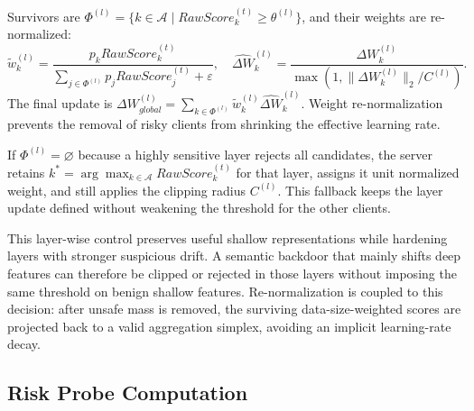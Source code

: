 \documentclass[runningheads,orivec]{llncs}
\begin{document}
Survivors are $\Phi^{(l)}=\{k\in\mathcal{A}\mid RawScore_k^{(t)}\ge\theta^{(l)}\}$, and their weights are re-normalized:
\begin{equation}
    \tilde{w}_{k}^{(l)}=\frac{p_kRawScore_k^{(t)}}{\sum_{j\in\Phi^{(l)}}p_jRawScore_j^{(t)}+\varepsilon},\quad
    \widehat{\Delta W}_k^{(l)}=\frac{\Delta W_k^{(l)}}{\max(1,\|\Delta W_k^{(l)}\|_2/C^{(l)})}.
\end{equation}
The final update is $\Delta W_{global}^{(l)}=\sum_{k\in\Phi^{(l)}}\tilde{w}_{k}^{(l)}\widehat{\Delta W}_k^{(l)}$. Weight re-normalization prevents the removal of risky clients from shrinking the effective learning rate.

If $\Phi^{(l)}=\varnothing$ because a highly sensitive layer rejects all candidates, the server retains $k^*=\arg\max_{k\in\mathcal{A}}RawScore_k^{(t)}$ for that layer, assigns it unit normalized weight, and still applies the clipping radius $C^{(l)}$. This fallback keeps the layer update defined without weakening the threshold for the other clients.

This layer-wise control preserves useful shallow representations while hardening layers with stronger suspicious drift. A semantic backdoor that mainly shifts deep features can therefore be clipped or rejected in those layers without imposing the same threshold on benign shallow features. Re-normalization is coupled to this decision: after unsafe mass is removed, the surviving data-size-weighted scores are projected back to a valid aggregation simplex, avoiding an implicit learning-rate decay.

\subsection{Risk Probe Computation}
\end{document}

